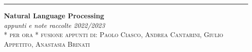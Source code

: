 \begin{titlepage}
	
    \raggedleft	

    \rule{1pt}{.9\textheight}
	\hspace{0.075\textwidth}
	\parbox[b]{.85\textwidth}{
		{\HUGE\bfseries Natural Language Processing
        }\\[2\baselineskip]
		{\Large\textit{appunti e note raccolte 2022/2023}}\\[47.5\baselineskip]
        {\Large\textsc{* per ora * fusione appunti di: Paolo Ciasco, Andrea Cantarini, Giulio Appetito, Anastasia Brinati}}\\[1\baselineskip]
        
	}
\end{titlepage}